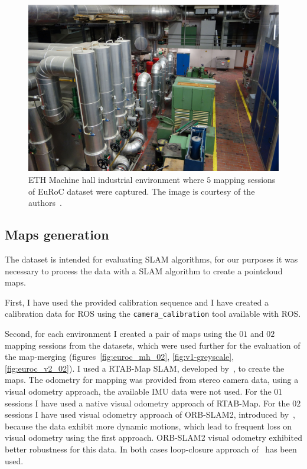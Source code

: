 \begin{figure}
    \centering
    \includegraphics[width=\textwidth]{../img/eth_machine_room.jpg}
    \caption[ETH Machine hall]{ETH Machine hall industrial environment where $5$ mapping sessions of EuRoC dataset were captured. The image is courtesy of the authors~\citep{Burri2016}.}
    \label{fig:eth-machine-hall}
\end{figure}

\subsection{Maps generation}
\label{sec:euroc-generating-maps}

The dataset is intended for evaluating \gls{SLAM} algorithms, for our purposes it was necessary to process the data with a \gls{SLAM} algorithm to create a pointcloud maps.

First, I have used the provided calibration sequence and I have created a calibration data for \gls{ROS} using the \texttt{camera\_calibration} tool available with \gls{ROS}.

Second, for each environment I created a pair of maps using the $01$ and $02$ mapping sessions from the datasets, which were used further for the evaluation of the map-merging (figures~\ref{fig:euroc_mh_02}, \ref{fig:v1-greyscale}, \ref{fig:euroc_v2_02}). I used a RTAB-Map \gls{SLAM}, developed by~\citet{labbe2014online}, to create the maps. The odometry for mapping was provided from stereo camera data, using a visual odometry approach, the available \gls{IMU} data were not used. For the $01$ sessions I have used a native visual odometry approach of RTAB-Map. For the $02$ sessions I have used visual odometry approach of {ORB-SLAM2}, introduced by~\citet{mur2017orb}, because the data exhibit more dynamic motions, which lead to frequent loss on visual odometry using the first approach. {ORB-SLAM2} visual odometry exhibited better robustness for this data. In both cases loop-closure approach of~\citet{labbe2014online} has been used.


